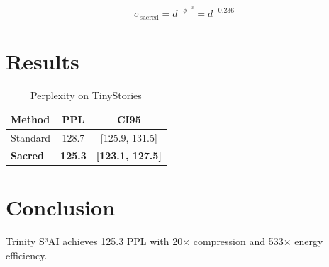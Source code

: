 \documentclass{article}
\begin{document}
\begin{equation}
\sigma_{\text{sacred}} = d^{-\phi^{-3}} = d^{-0.236}
\end{equation}

\section{Results}

\begin{table}[h]
\centering
\caption{Perplexity on TinyStories}
\begin{tabular}{lcc}
\toprule
Method & PPL & CI95 \\
\midrule
Standard & 128.7 & [125.9, 131.5] \\
\textbf{Sacred} & \textbf{125.3} & \textbf{[123.1, 127.5]} \\
\bottomrule
\end{tabular}
\end{table}

\section{Conclusion}

Trinity S³AI achieves 125.3 PPL with 20× compression and 533× energy efficiency.
\end{document}
